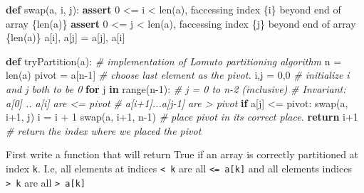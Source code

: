\documentclass[
]{article}
\newenvironment{Shaded}{}{}
\newcommand{\BuiltInTok}[1]{\textcolor[rgb]{0.00,0.50,0.00}{#1}}
\newcommand{\CommentTok}[1]{\textcolor[rgb]{0.38,0.63,0.69}{\textit{#1}}}
\newcommand{\ControlFlowTok}[1]{\textcolor[rgb]{0.00,0.44,0.13}{\textbf{#1}}}
\newcommand{\DecValTok}[1]{\textcolor[rgb]{0.25,0.63,0.44}{#1}}
\newcommand{\KeywordTok}[1]{\textcolor[rgb]{0.00,0.44,0.13}{\textbf{#1}}}
\newcommand{\NormalTok}[1]{#1}
\newcommand{\OperatorTok}[1]{\textcolor[rgb]{0.40,0.40,0.40}{#1}}
\newcommand{\SpecialCharTok}[1]{\textcolor[rgb]{0.25,0.44,0.63}{#1}}
\newcommand{\SpecialStringTok}[1]{\textcolor[rgb]{0.73,0.40,0.53}{#1}}
\begin{document}
\begin{Shaded}
\begin{Highlighting}[]
\KeywordTok{def}\NormalTok{ swap(a, i, j):}
    \ControlFlowTok{assert} \DecValTok{0} \OperatorTok{\textless{}=}\NormalTok{ i }\OperatorTok{\textless{}} \BuiltInTok{len}\NormalTok{(a), }\SpecialStringTok{f\textquotesingle{}accessing index }\SpecialCharTok{\{}\NormalTok{i}\SpecialCharTok{\}}\SpecialStringTok{ beyond end of array }\SpecialCharTok{\{}\BuiltInTok{len}\NormalTok{(a)}\SpecialCharTok{\}}\SpecialStringTok{\textquotesingle{}}
    \ControlFlowTok{assert} \DecValTok{0} \OperatorTok{\textless{}=}\NormalTok{ j }\OperatorTok{\textless{}} \BuiltInTok{len}\NormalTok{(a), }\SpecialStringTok{f\textquotesingle{}accessing index }\SpecialCharTok{\{}\NormalTok{j}\SpecialCharTok{\}}\SpecialStringTok{ beyond end of array }\SpecialCharTok{\{}\BuiltInTok{len}\NormalTok{(a)}\SpecialCharTok{\}}\SpecialStringTok{\textquotesingle{}}
\NormalTok{    a[i], a[j] }\OperatorTok{=}\NormalTok{ a[j], a[i]}

\KeywordTok{def}\NormalTok{ tryPartition(a):}
    \CommentTok{\# implementation of Lomuto partitioning algorithm}
\NormalTok{    n }\OperatorTok{=} \BuiltInTok{len}\NormalTok{(a)}
\NormalTok{    pivot }\OperatorTok{=}\NormalTok{ a[n}\OperatorTok{{-}}\DecValTok{1}\NormalTok{] }\CommentTok{\# choose last element as the pivot.}
\NormalTok{    i,j }\OperatorTok{=} \DecValTok{0}\NormalTok{,}\DecValTok{0} \CommentTok{\# initialize i and j both to be 0}
    \ControlFlowTok{for}\NormalTok{ j }\KeywordTok{in} \BuiltInTok{range}\NormalTok{(n}\OperatorTok{{-}}\DecValTok{1}\NormalTok{): }\CommentTok{\# j = 0 to n{-}2 (inclusive)}
        \CommentTok{\# Invariant: a[0] .. a[i] are \textless{}= pivot}
        \CommentTok{\#            a[i+1]...a[j{-}1] are \textgreater{} pivot}
        \ControlFlowTok{if}\NormalTok{ a[j] }\OperatorTok{\textless{}=}\NormalTok{ pivot:}
\NormalTok{            swap(a, i}\OperatorTok{+}\DecValTok{1}\NormalTok{, j)}
\NormalTok{            i }\OperatorTok{=}\NormalTok{ i }\OperatorTok{+} \DecValTok{1}
\NormalTok{    swap(a, i}\OperatorTok{+}\DecValTok{1}\NormalTok{, n}\OperatorTok{{-}}\DecValTok{1}\NormalTok{) }\CommentTok{\# place pivot in its correct place.}
    \ControlFlowTok{return}\NormalTok{ i}\OperatorTok{+}\DecValTok{1} \CommentTok{\# return the index where we placed the pivot}
\end{Highlighting}
\end{Shaded}

First write a function that will return True if an array is correctly
partitioned at index \texttt{k}. I.e, all elements at indices
\texttt{\textless{}\ k} are all \texttt{\textless{}=\ a{[}k{]}} and all
elements indices \texttt{\textgreater{}\ k} are all
\texttt{\textgreater{}\ a{[}k{]}}
\end{document}
